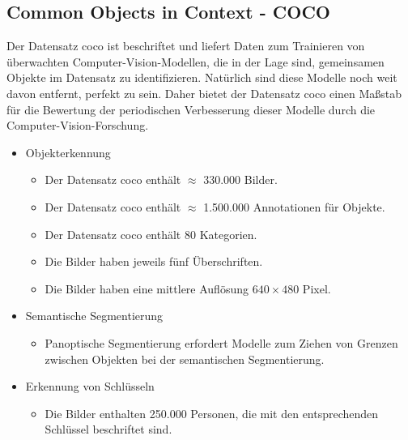 %
%


\subsection{Common Objects in Context - COCO}


Der Datensatz \ac{coco} ist beschriftet und liefert Daten zum Trainieren von überwachten Computer-Vision-Modellen, die in der Lage sind, gemeinsamen Objekte im Datensatz zu identifizieren. Natürlich sind diese Modelle noch weit davon entfernt, perfekt zu sein. Daher bietet der Datensatz \ac{coco} einen Maßstab für die Bewertung der periodischen Verbesserung dieser Modelle durch die Computer-Vision-Forschung.\cite{Lin:2014,Coco:2021}

\bigskip

\begin{itemize}
    \item Objekterkennung
     \begin{itemize}
       \item Der Datensatz \ac{coco} enthält $\approx$ 330.000 Bilder.
       \item Der Datensatz \ac{coco} enthält $\approx$ 1.500.000 Annotationen für Objekte.
       \item Der Datensatz \ac{coco} enthält 80 Kategorien.
       \item Die Bilder haben jeweils fünf Überschriften.
       \item Die Bilder haben eine mittlere Auflösung  $640 \times 480$ Pixel.
     \end{itemize}  
  \item Semantische Segmentierung
    \begin{itemize}
        \item Panoptische Segmentierung erfordert Modelle zum Ziehen von Grenzen zwischen Objekten bei der semantischen Segmentierung.
    \end{itemize}

  \item Erkennung von Schlüsseln
    \begin{itemize}
      \item Die Bilder enthalten 250.000 Personen, die mit den entsprechenden Schlüssel  beschriftet sind.
    \end{itemize}
\end{itemize}




